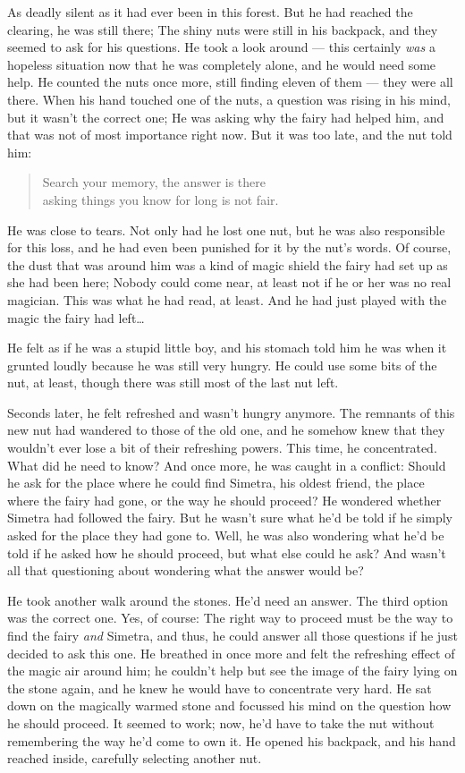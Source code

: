 As deadly silent as it had ever been in this forest. But he had reached the clearing, he was still there; The shiny nuts were still in his backpack, and they seemed to ask for his questions. He took a look around --- this certainly \emph{was} a hopeless situation now that he was completely alone, and he would need some help. He counted the nuts once more, still finding eleven of them --- they were all there. When his hand touched one of the nuts, a question was rising in his mind, but it wasn't the correct one; He was asking why the fairy had helped him, and that was not of most importance right now. But it was too late, and the nut told him: 
\begin{quote}
Search your memory, the answer is there\\
asking things you know for long is not fair. 
\end{quote}
He was close to tears. Not only had he lost one nut, but he was also responsible for this loss, and he had even been punished for it by the nut's words. Of course, the dust that was around him was a kind of magic shield the fairy had set up as she had been here; Nobody could come near, at least not if he or her was no real magician. This was what he had read, at least. And he had just played with the magic the fairy had left\dots

He felt as if he was a stupid little boy, and his stomach told him he was when it grunted loudly because he was still very hungry. He could use some bits of the nut, at least, though there was still most of the last nut left.

Seconds later, he felt refreshed and wasn't hungry anymore. The remnants of this new nut had wandered to those of the old one, and he somehow knew that they wouldn't ever lose a bit of their refreshing powers. 
This time, he concentrated. What did he need to know? And once more, he was caught in a conflict: Should he ask for the place where he could find Simetra, his oldest friend, the place where the fairy had gone, or the way he should proceed? He wondered whether Simetra had followed the fairy. But he wasn't sure what he'd be told if he simply asked for the place they had gone to. Well, he was also wondering what he'd be told if he asked how he should proceed, but what else could he ask? And wasn't all that questioning about wondering what the answer would be?

He took another walk around the stones. He'd need an answer. The third option was the correct one. Yes, of course: The right way to proceed must be the way to find the fairy \emph{and} Simetra, and thus, he could answer all those questions if he just decided to ask this one. 
He breathed in once more and felt the refreshing effect of the magic air around him; he couldn't help but see the image of the fairy lying on the stone again, and he knew he would have to concentrate very hard. He sat down on the magically warmed stone and focussed his mind on the question how he should proceed. It seemed to work; now, he'd have to take the nut without remembering the way he'd come to own it. He opened his backpack, and his hand reached inside, carefully selecting another nut.

